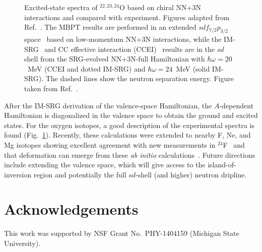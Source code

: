 \begin{figure}[t]
\begin{center}
\end{center}
\caption{Excited-state spectra of $^{22,23,24}$O based on chiral NN+3N
interactions and compared with experiment. Figures adapted from
Ref.~\cite{Bogner:2014tg}. The MBPT results are performed in an extended
$sdf_{7/2}p_{3/2}$ space~\cite{Holt:2013fk} based on low-momentum NN+3N
interactions, while the IM-SRG~\cite{Bogner:2014tg} and CC effective
interaction (CCEI)~\cite{Jansen:2014qf} results are in the $sd$ shell from
the SRG-evolved NN+3N-full Hamiltonian with $\hbar \omega=20$~MeV
(CCEI and dotted IM-SRG) and $\hbar \omega=24$~MeV (solid IM-SRG). The
dashed lines show the neutron separation energy.
Figure taken from Ref.~\cite{Hebeler:2015xq}.\label{fig:Ospectra}}
\end{figure}

After the IM-SRG derivation of the valence-space Hamiltonian, the
$A$-dependent Hamiltonian is diagonalized in the valence space to
obtain the ground and excited states. For the oxygen isotopes, a good
description of the experimental spectra is found
(Fig.~\ref{fig:Ospectra}).  Recently, these calculations were extended
to nearby F, Ne, and Mg isotopes showing excellent agreement with new
measurements in $^{24}$F~\cite{Caceres:2015fk} and that deformation
can emerge from these \emph{ab initio}
calculations~\cite{Stroberg:2015qr}. Future directions include
extending the valence space, which will give access to the
island-of-inversion region and potentially the full $sd$-shell (and
higher) neutron dripline.



\section{Acknowledgements}
This work was supported by NSF Grant No.~PHY-1404159 (Michigan State University).


